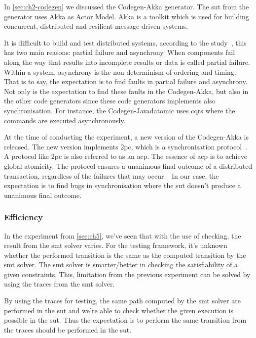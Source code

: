 In \autoref{sec:ch2-codegen} we discussed the Codegen-Akka generator. The
\gls{sut} from the generator uses Akka as Actor Model. Akka is a toolkit
which is used for building concurrent, distributed and resilient
message-driven systems.~\cite[p.~4]{roestenburg2016akka}

It is difficult to build and test distributed systems, according to the
study~\cite[p.~1]{mccaffrey2016verification}, this has two main reasons: partial
failure and asynchrony. When components fail along the way that results into
incomplete results or data is called partial failure. Within a system,
asynchrony is the non-determinism of ordering and timing. That is to say, the
expectation is to find faults in partial failure and asynchrony. Not only is the
expectation to find these faults in the Codegen-Akka, but also in the other code
generators since these code generators implements also synchronisation. For
instance, the Codegen-Javadatomic uses \gls{cqrs} where the commands are
executed asynchronously.

At the time of conducting the experiment, a new version of the Codegen-Akka is
released. The new version implements \gls{2pc}, which is a synchronisation
protocol~\cite[p.~3204]{al2009two}. A protocol like \gls{2pc} is also referred
to as an \gls{acp}. The essence of \gls{acp} is to achieve global atomicity. The
protocol ensures a unanimous final outcome of a distributed transaction,
regardless of the failures that may occur.~\cite[p.~3204]{al2009two} In our
case, the expectation is to find bugs in synchronisation where the \gls{sut}
doesn't produce a unanimous final outcome.

\subsubsection{Efficiency}
In the experiment from \autoref{sec:ch5}, we've seen that with the use of
checking, the result from the \gls{smt} solver varies. For the testing
framework, it's unknown whether the performed transition is the same as the
computed transition by the \gls{smt} solver. The \gls{smt} solver is
smarter/better in checking the satisfiability of a given constraints. This,
limitation from the previous experiment can be solved by using the traces from
the \gls{smt} solver.

By using the traces for testing, the same path computed by the \gls{smt} solver
are performed in the \gls{sut} and we're able to check whether the given
execution is possible in the \gls{sut}. Thus the expectation is to perform the
same transition from the traces should be performed in the \gls{sut}.

